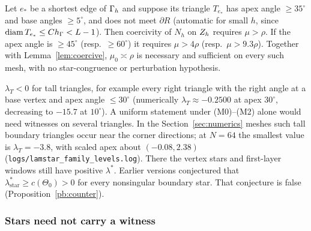 \begin{corollary}\label{pb:rho}
Let $e_\ast$ be a shortest edge of $\Gamma_h$ and suppose its triangle $T_{e_\ast}$ has apex angle $\ge35^\circ$ and base angles $\ge5^\circ$, and does not meet $\partial R$ (automatic for small $h$, since $\operatorname{diam} T_{e_\ast}\le Ch_\Gamma<L-1$).
Then coercivity of $N_h$ on $Z_h$ requires $\mu>\rho$. If the apex angle is $\ge45^\circ$ (resp.\ $\ge60^\circ$) it requires
$\mu>4\rho$ (resp.\ $\mu>9.3\rho$). Together with Lemma~\ref{lem:coercive}, $\mu_0\asymp\rho$ is necessary and sufficient on
every such mesh, with no star-congruence or perturbation hypothesis.
\end{corollary}

\begin{remark}\label{pb:limits}
$\lambda_T<0$ for tall triangles, for example every right triangle with the right angle at a base vertex and apex angle
$\le30^\circ$ (numerically $\lambda_T\approx-0.2500$ at apex $30^\circ$, decreasing to $-15.7$ at $10^\circ$). A uniform statement under (M0)--(M2) alone would need witnesses on
several triangles. In the Section~\ref{sec:numerics} meshes such tall boundary triangles occur near the corner directions;
at $N=64$ the smallest value is $\lambda_T=-3.8$, with scaled apex about $(-0.08,2.38)$ (\texttt{logs/lamstar\_family\_levels.log}). There the vertex stars and first-layer windows still
have positive $\lambda^\ast$. Earlier versions conjectured that $\lambda^\ast_{\text{star}}\ge c(\Theta_0)>0$ for every nonsingular boundary star. That conjecture is false (Proposition~\ref{pb:counter}).
\end{remark}

\subsubsection{Stars need not carry a witness}

